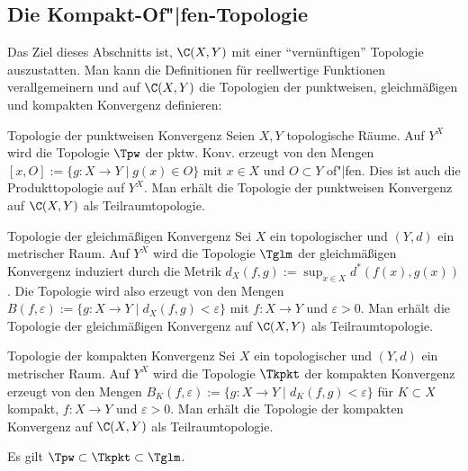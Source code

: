 \pagebreak

\subsection{%
    Die Kompakt-Of"|fen-Topologie%
}

\begin{Bem}
    Das Ziel dieses Abschnitts ist, $\C(X, Y)$ mit einer "`vernünftigen"'
    Topologie auszustatten.
    Man kann die Definitionen für reellwertige Funktionen
    verallgemeinern und auf $\C(X, Y)$ die Topologien der punktweisen,
    gleichmäßigen und kompakten Konvergenz definieren:
\end{Bem}

\begin{Def}{Topologie der punktweisen Konvergenz}
    Seien $X, Y$ topologische Räume.
    Auf $Y^X$ wird die Topologie $\Tpw$ der pktw. Konv. erzeugt
    von den Mengen $[x, O] := \{g\colon X \rightarrow Y \;|\; g(x) \in O\}$
    mit $x \in X$ und $O \subset Y$ of"|fen.
    Dies ist auch die Produkttopologie auf $Y^X$.
    Man erhält die Topologie der punktweisen Konvergenz auf $\C(X, Y)$
    als Teilraumtopologie.
\end{Def}

\begin{Def}{Topologie der gleichmäßigen Konvergenz}
    Sei $X$ ein topologischer und $(Y, d)$ ein metrischer Raum.
    Auf $Y^X$ wird die Topologie $\Tglm$ der gleichmäßigen Konvergenz
    induziert durch die Metrik
    $d_X(f, g) := \sup_{x \in X} d^\ast(f(x), g(x))$.
    Die Topologie wird also erzeugt von den Mengen
    $B(f, \varepsilon) :=
    \{g\colon X \rightarrow Y \;|\; d_X(f, g) < \varepsilon\}$
    mit $f\colon X \rightarrow Y$ und $\varepsilon > 0$.
    Man erhält die Topologie der gleichmäßigen Konvergenz auf $\C(X, Y)$
    als Teilraumtopologie.
\end{Def}

\begin{Def}{Topologie der kompakten Konvergenz}
    Sei $X$ ein topologischer und $(Y, d)$ ein metrischer Raum.
    Auf $Y^X$ wird die Topologie $\Tkpkt$ der kompakten Konvergenz
    erzeugt von den Mengen $B_K(f, \varepsilon) :=
    \{g\colon X \rightarrow Y \;|\; d_K(f, g) < \varepsilon\}$
    für $K \subset X$ kompakt, $f\colon X \rightarrow Y$ und $\varepsilon > 0$.
    Man erhält die Topologie der kompakten Konvergenz auf $\C(X, Y)$
    als Teilraumtopologie.
\end{Def}

\begin{Bem}
    Es gilt $\Tpw \subset \Tkpkt \subset \Tglm$.
\end{Bem}

